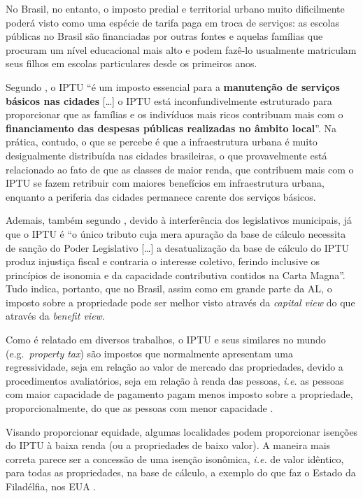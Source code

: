 \documentclass[
	12pt,				%
	oneside,			%
	a4paper,			%
	chapter=TITLE,		%
	section=TITLE,		%
	english,			%
	brazil				%
	]{abntex2}
\begin{document}
\begin{refsection}
No Brasil, no entanto, o imposto predial e territorial urbano muito dificilmente
poderá visto como uma espécie de tarifa paga em troca de serviços: as escolas
públicas no Brasil são financiadas por outras fontes e aquelas famílias que
procuram um nível educacional mais alto e podem fazê-lo usualmente matriculam
seus filhos em escolas particulares desde os primeiros anos.

Segundo \textcite[p.~86, grifo nosso]{decesare2020}, o \gls{IPTU} ``é um imposto essencial
para a \textbf{manutenção de serviços básicos nas cidades} {[}\ldots{]} o \gls{IPTU} está
inconfundivelmente estruturado para proporcionar que as famílias e os indivíduos
mais ricos contribuam mais com o \textbf{financiamento das despesas públicas
realizadas no âmbito local}''. Na prática, contudo, o que se percebe é que a
infraestrutura urbana é muito desigualmente distribuída nas cidades brasileiras,
o que provavelmente está relacionado ao fato de que as classes de maior renda,
que contribuem mais com o \gls{IPTU} se fazem retribuir com maiores benefícios
em infraestrutura urbana, enquanto a periferia das cidades permanece carente dos
serviços básicos.

Ademais, também segundo \textcite[p.~83-84]{decesare2020}, devido à interferência dos
legislativos municipais, já que o \gls{IPTU} é ``o único tributo cuja mera
apuração da base de cálculo necessita de sanção do Poder Legislativo {[}\ldots{]} a
desatualização da base de cálculo do \gls{IPTU} produz injustiça fiscal e
contraria o interesse coletivo, ferindo inclusive os princípios de isonomia e da
capacidade contributiva contidos na Carta Magna''. Tudo indica, portanto, que no
Brasil, assim como em grande parte da \gls{AL}, o imposto sobre a propriedade
pode ser melhor visto através da \emph{capital view} do que através da \emph{benefit view}.

Como é relatado em diversos trabalhos, o \gls{IPTU} e seus similares no mundo
(e.g.~\emph{property tax}) são impostos que normalmente apresentam uma regressividade,
seja em relação ao valor de mercado das propriedades, devido a procedimentos
avaliatórios, seja em relação à renda das pessoas, \emph{i.e.} as pessoas com maior
capacidade de pagamento pagam menos imposto sobre a propriedade,
proporcionalmente, do que as pessoas com menor capacidade \autocites{McMillen2020}[p.~3]{landtax}{fonseca2020}.

Visando proporcionar equidade, algumas localidades podem proporcionar isenções
do \gls{IPTU} à baixa renda (ou a propriedades de baixo valor). A maneira mais
correta parece ser a concessão de uma isenção isonômica, \emph{i.e.} de valor
idêntico, para todas as propriedades, na base de cálculo, a exemplo do que faz o
Estado da Filadélfia, nos \gls{EUA} \autocite[p.~155]{McMillen2020}.


\end{refsection}
\end{document}
